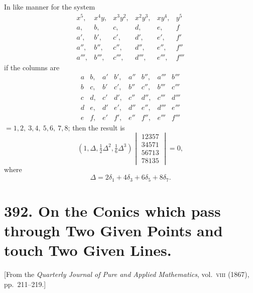 \documentclass[11pt,a4paper]{article}
\theoremstyle{plain}
\begin{document}
\newpage
\setcounter{equation}{17}

In like manner for the system
\begin{equation}
\begin{matrix}
x^5, & x^4y, & x^3y^2, & x^2y^3, & xy^4, & y^5 \\
a, & b, & c, & d, & e, & f \\
a', & b', & c', & d', & e', & f' \\
a'', & b'', & c'', & d'', & e'', & f'' \\
a''', & b''', & c''', & d''', & e''', & f'''
\end{matrix}
\end{equation}
if the columns are
\begin{equation}
\begin{array}{cc|cc|cc|cc}
a & b, & a' & b', & a'' & b'', & a''' & b''' \\
b & c, & b' & c', & b'' & c'', & b''' & c''' \\
c & d, & c' & d', & c'' & d'', & c''' & d''' \\
d & e, & d' & e', & d'' & e'', & d''' & e''' \\
e & f, & e' & f', & e'' & f'', & e''' & f'''
\end{array}
\end{equation}
$= 1, 2,\ 3, 4,\ 5, 6,\ 7, 8$;
then the result is
\begin{equation}
(1, \Delta, \tfrac{1}{2}\Delta^2, \tfrac{1}{6}\Delta^3)
\begin{vmatrix}
12357 \\
34571 \\
56713 \\
78135
\end{vmatrix} = 0,
\end{equation}
where
\begin{equation}
\Delta = 2\delta_1 + 4\delta_3 + 6\delta_5 + 8\delta_7.
\end{equation}

\newpage

\section*{392. On the Conics which pass through Two Given Points and touch Two Given Lines.}
\label{sec:392}
\begin{center}
[From the \textit{Quarterly Journal of Pure and Applied Mathematics}, vol.~\textsc{viii} (1867), pp.~211--219.]
\end{center}
\end{document}

